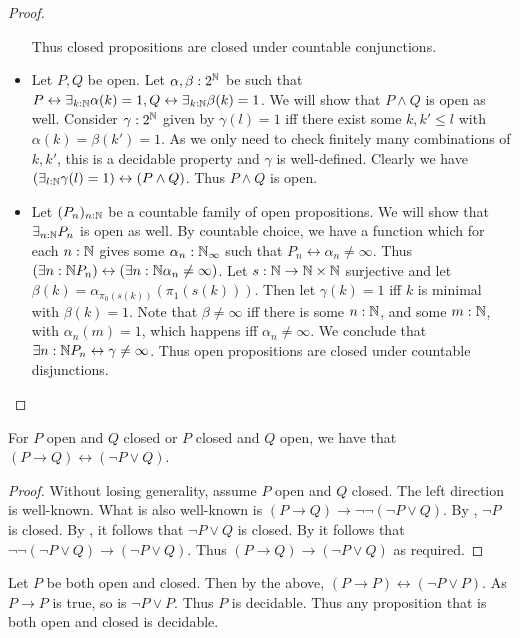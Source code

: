 \begin{proof}
\begin{itemize}
      Thus closed propositions are closed under countable conjunctions. 
    \item 
      Let $P,Q$ be open. Let $\alpha,\beta:2^{\mathbb{N}}$ be such that 
      $
      P\leftrightarrow \exists_{k:\mathbb{N}}  \alpha(k) = 1, 
      Q\leftrightarrow \exists_{k:\mathbb{N}}  \beta(k) = 1
      $. 
      We will show that $P\wedge Q$ is open as well. 
      Consider $\gamma:2^{\mathbb{N}}$ given by 
      $\gamma(l) = 1$ iff there exist some $k,k'\leq l$ with 
      $\alpha(k) = \beta(k') = 1$. As we only need to check finitely many combinations 
      of $k,k'$, this is a decidable property and $\gamma$ is well-defined. 
      Clearly we have $(\exists_{l:\mathbb{N}} \gamma(l) = 1) \leftrightarrow (P \wedge Q)$. 
      Thus $P\wedge Q$ is open. 
    \item Let $(P_n)_{n:\mathbb{N}}$ be a countable family of open propositions. 
      We will show that $\exists_{n:\mathbb{N}}P_n$ is open as well. 
      By countable choice, we have a function which for each 
      $n:\mathbb{N}$ gives some $\alpha_n:\mathbb{N}_{\infty}$ 
      such that $P_n \leftrightarrow \alpha_n \neq \infty$. 
      Thus $(\exists{n:\mathbb{N}} P_n) \leftrightarrow 
      (\exists{n:\mathbb{N}}\alpha_n \neq \infty)$. 
      Let $s:\mathbb{N} \to \mathbb{N} \times \mathbb{N}$ surjective and let 
      $\beta(k) = \alpha_{\pi_0(s(k))}(\pi_1 (s(k)))$. 
      Then let $\gamma(k) = 1$ iff $k$ is minimal with $\beta(k) = 1$. 
      Note that $\beta \neq \infty$ iff there is some $n:\mathbb{N}$, 
      and some $m:\mathbb{N}$, with $\alpha_n(m) = 1$, 
      which happens iff $\alpha_n \neq \infty$. 
      We conclude that $\exists{n:\mathbb{N}} P_n \leftrightarrow \gamma \neq \infty$.
      Thus open propositions are closed under countable disjunctions. 
  \end{itemize}   
\end{proof}


\begin{lemma}\label{OpenClosedImplication}
  For $P$ open and $Q$ closed or $P$ closed and $Q$ open, we have that $(P\to Q) \leftrightarrow (\neg P \vee Q)$. 
\end{lemma}
\begin{proof}
  Without losing generality, assume $P$ open and $Q$ closed. 
  The left direction is well-known. 
  What is also well-known is 
  $(P \to Q) \to \neg \neg (\neg P \vee Q)$.
  By , $\neg P$ is closed. 
  By , it follows that $\neg P \vee Q$ is closed. 
  By  it follows that $\neg \neg (\neg P \vee Q) \to (\neg P \vee Q)$. 
  Thus $(P \to Q) \to (\neg P \vee Q)$ as required. 
\end{proof}
\begin{corollary}\label{OpenAndClosedMeansDecidable}
  Let $P$ be both open and closed. 
  Then by the above, $(P\to P)\leftrightarrow (\neg P \vee P)$. 
  As $P\to P$ is true, so is $\neg P \vee P$. Thus $P$ is decidable. 
  Thus any proposition that is both open and closed is decidable. 
\end{corollary}

